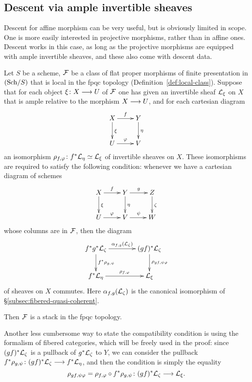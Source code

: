 \begin{4   STACKS}
\begin{4.3 Descent for morphisms of schemes}
\subsection{Descent via ample invertible sheaves}\label{subsec:descent-ample}

Descent for affine morphism can be very useful, but is obviously limited in scope. One is more easily interested in projective morphisms, rather than in affine ones. Descent works in this case, as long as the projective morphisms are equipped with ample invertible sheaves, and these also come with descent data.

\begin{theorem}\label{thm:descent-ample}
Let $S$ be a scheme, $\mathcal{F}$ be a class of flat proper morphisms of finite presentation in $({\mathrm{Sch}/S})$ that is local in the fpqc topology (Definition~\ref{def:local-class}). Suppose that for each object $\xi\colon X \arr U$ of $\mathcal{F}$ one has given an invertible sheaf $\mathcal{L}_\xi$ on $X$ that is ample relative to the morphism $X \arr U$, and for each cartesian diagram
   \[
   \xymatrix{
   X \ar[r]^f \ar[d]^\xi & Y\ar[d]^\eta\\
   U \ar[r]^\phi         & V
   }
   \]
an isomorphism $\rho_{f, \varphi} \colon f^*\mathcal{L}_\eta \simeq \mathcal{L}_\xi$ of invertible  sheaves on $X$. These isomorphisms are required to satisfy the following condition: whenever we have a cartesian diagram of schemes
   \[
   \xymatrix{
   X \ar[r]^f \ar[d]^\xi & Y \ar[r]^g \ar[d]^\eta & Z \ar[d]^\zeta \\
   U \ar[r]^\phi         & V \ar[r]^\psi           & W
   }
   \]
whose columns are in $\mathcal{F}$, then the diagram
   \[
   \xymatrix@C+15pt{
   f^*g^*\cL_\zeta \ar[r]^-{\isoass_{f,g}(\cL_\zeta)}
      \ar[d]^{f^* \rho_{g, \psi}}
      & (gf)^*\cL_\zeta \ar[d]^{\rho_{gf, \psi\phi}}
   \\
   f^* \cL_\eta  \ar[r]^-{\rho_{f, \phi}}&
      {}\cL_\xi 
   }
   \]
of \qc sheaves on $X$ commutes. Here $\alpha_{f,g}(\mathcal{L}_\zeta)$ is the canonical isomorphism of \S\ref{subsec:fibered-quasi-coherent}.

Then $\mathcal{F}$ is a stack in the fpqc topology.
\end{theorem}


Another less cumbersome way to state the compatibility condition is using the formalism of fibered categories, which will be freely used in the proof: since $(gf)^{*}\mathcal{L}_{\zeta}$ is a pullback of $g^{*}\mathcal{L}_{\zeta}$ to $Y$, we can consider the pullback $f^{*}\rho_{g, \psi}\colon (gf)^{*}\cL_{\zeta} \arr f^{*}\cL_{\eta}$, and then the condition is simply the equality
   \[
   \rho_{gf, \psi\phi} = \rho_{f, \phi} \circ f^* \rho_{g, \psi}
      \colon (gf)^*\cL_\zeta \arr \cL_{\xi}.
   \]



\end{4.3 Descent for morphisms of schemes}
\end{4   STACKS}
